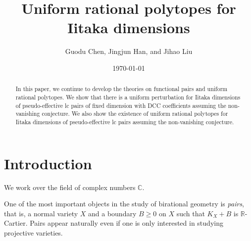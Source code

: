 \documentclass[11pt]{amsart}
\numberwithin{equation}{section}
\newcommand{\Rr}{\mathbb{R}}
\theoremstyle{definition}
\theoremstyle{definition}
\begin{document}
\title{Uniform rational polytopes for Iitaka dimensions}


\author{Guodu Chen, Jingjun Han, and Jihao Liu}

\begin{abstract}
In this paper, we continue to develop the theories on functional pairs and uniform rational polytopes. We show that there is a uniform perturbation for Iitaka dimensions of pseudo-effective lc pairs of fixed dimension with DCC coefficients assuming the non-vanishing conjecture. We also show the existence of uniform rational polytopes for Iitaka dimensions of pseudo-effective lc pairs assuming the non-vanishing conjecture. %
\end{abstract}

\address{Institute for Theoretical Sciences, Westlake University, Hangzhou, Zhejiang, 310024, China}


\address{Shanghai Center for Mathematical Sciences, Fudan University, Shanghai, 200438, China}


\address{Department of Mathematics, Northwestern University, 2033 Sheridan Rd, Evanston, IL 60208, USA}



\date{\today}


\maketitle

\tableofcontents



\section{Introduction}
We work over the field of complex numbers $\mathbb C$. 

One of the most important objects in the study of birational geometry is \emph{pairs}, that is, a normal variety $X$ and a boundary $B\geq 0$ on $X$ such that $K_X+B$ is $\Rr$-Cartier. Pairs appear naturally even if one is only interested in studying projective varieties. 
\end{document}

